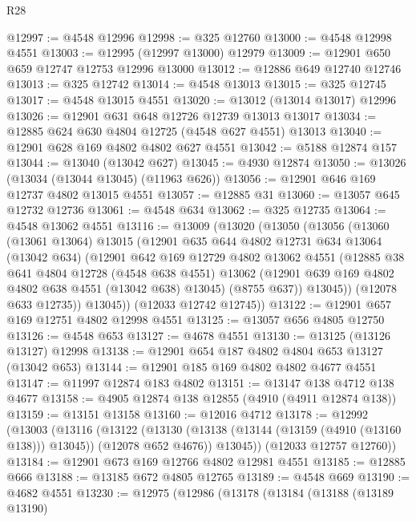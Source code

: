 \begin{lexlean}{R28}
\begin{coremodule}
@12997 := @4548 @12996
@12998 := @325 @12760
@13000 := @4548 @12998 @4551
@13003 := @12995 (@12997 @13000) @12979
@13009 := @12901 @650 @659 @12747 @12753 @12996 @13000
@13012 := @12886 @649 @12740 @12746
@13013 := @325 @12742
@13014 := @4548 @13013
@13015 := @325 @12745
@13017 := @4548 @13015 @4551
@13020 := @13012 (@13014 @13017) @12996
@13026 := @12901 @631 @648 @12726 @12739 @13013 @13017
@13034 := @12885 @624 @630 @4804 @12725 (@4548 @627 @4551) @13013
@13040 := @12901 @628 @169 @4802 @4802 @627 @4551
@13042 := @5188 @12874 @157
@13044 := @13040 (@13042 @627)
@13045 := @4930 @12874
@13050 := @13026 (@13034 (@13044 @13045) (@11963 @626))
@13056 := @12901 @646 @169 @12737 @4802 @13015 @4551
@13057 := @12885 @31
@13060 := @13057 @645 @12732 @12736
@13061 := @4548 @634
@13062 := @325 @12735
@13064 := @4548 @13062 @4551
@13116 := @13009
    (@13020
      (@13050
        (@13056
          (@13060
            (@13061 @13064)
            @13015
            (@12901
              @635
              @644
              @4802
              @12731
              @634
              @13064
              (@13042 @634)
              (@12901
                @642
                @169
                @12729
                @4802
                @13062
                @4551
                (@12885
                  @38
                  @641
                  @4804
                  @12728
                  (@4548 @638 @4551)
                  @13062
                  (@12901 @639 @169 @4802 @4802 @638 @4551 (@13042 @638) @13045)
                  (@8755 @637))
                @13045))
            (@12078 @633 @12735))
          @13045))
      (@12033 @12742 @12745))
@13122 := @12901 @657 @169 @12751 @4802 @12998 @4551
@13125 := @13057 @656 @4805 @12750
@13126 := @4548 @653
@13127 := @4678 @4551
@13130 := @13125 (@13126 @13127) @12998
@13138 := @12901 @654 @187 @4802 @4804 @653 @13127 (@13042 @653)
@13144 := @12901 @185 @169 @4802 @4802 @4677 @4551
@13147 := @11997 @12874 @183 @4802
@13151 := @13147 @138 @4712 @138 @4677
@13158 := @4905 @12874 @138 @12855 (@4910 (@4911 @12874 @138))
@13159 := @13151 @13158
@13160 := @12016 @4712
@13178 := @12992
    (@13003
      (@13116
        (@13122
          (@13130 (@13138 (@13144 (@13159 (@4910 (@13160 @138))) @13045)) (@12078 @652 @4676))
          @13045))
      (@12033 @12757 @12760))
@13184 := @12901 @673 @169 @12766 @4802 @12981 @4551
@13185 := @12885 @666
@13188 := @13185 @672 @4805 @12765
@13189 := @4548 @669
@13190 := @4682 @4551
@13230 := @12975
    (@12986
      (@13178
        (@13184
          (@13188
            (@13189 @13190)

\end{coremodule}
\end{lexlean}
